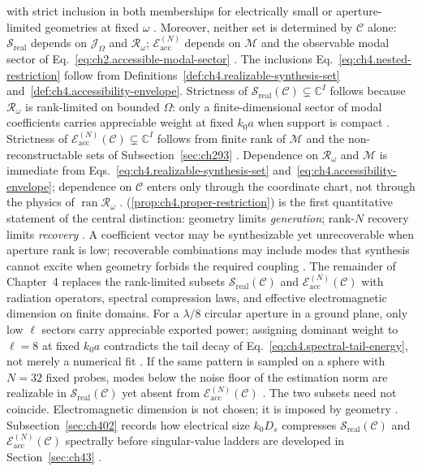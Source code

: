 with strict inclusion in both memberships for electrically small or aperture-limited geometries at
fixed \(\omega\) \cite{stratton1941}. Moreover, neither set is determined by
\(\mathcal{C}\) alone: \(\mathcal{S}_{\mathrm{real}}\) depends on \(\mathcal{J}_\Omega\) and
\(\mathcal{R}_\omega\); \(\mathcal{E}_{\mathrm{acc}}^{(N)}\) depends on \(\mathcal{M}\) and the
observable modal sector of Eq.~\eqref{eq:ch2.accessible-modal-sector}
\cite{harrington2001}.
The inclusions Eq.~\eqref{eq:ch4.nested-restriction} follow from
Definitions~\ref{def:ch4.realizable-synthesis-set} and~\ref{def:ch4.accessibility-envelope}.
Strictness of \(\mathcal{S}_{\mathrm{real}}(\mathcal{C})\subsetneq\mathbb{C}^{I}\) follows because
\(\mathcal{R}_\omega\) is rank-limited on bounded \(\Omega\): only a finite-dimensional
sector of modal coefficients carries appreciable weight at fixed \(k_0 a\) when support is compact
\cite{stratton1941}. Strictness of
\(\mathcal{E}_{\mathrm{acc}}^{(N)}(\mathcal{C})\subsetneq\mathbb{C}^{I}\) follows from finite rank
of \(\mathcal{M}\) and the non-reconstructable sets of Subsection~\ref{sec:ch293}
\cite{harrington2001}. Dependence on \(\mathcal{R}_\omega\) and \(\mathcal{M}\) is immediate from
Eqs.~\eqref{eq:ch4.realizable-synthesis-set} and~\eqref{eq:ch4.accessibility-envelope}; dependence
on \(\mathcal{C}\) enters only through the coordinate chart, not through the physics of
\(\operatorname{ran}\mathcal{R}_\omega\) \cite{devaney2004}.
(\ref{prop:ch4.proper-restriction}) is the first quantitative statement of the
central distinction: geometry limits \emph{generation}; rank-$N$ recovery limits
\emph{recovery} \cite{hansen1988}. A coefficient vector may be synthesizable yet
unrecoverable when aperture rank is low; recoverable combinations may include modes that synthesis
cannot excite when geometry forbids the required coupling \cite{harrington2001}. The
remainder of Chapter~4 replaces the rank-limited subsets
\(\mathcal{S}_{\mathrm{real}}(\mathcal{C})\) and \(\mathcal{E}_{\mathrm{acc}}^{(N)}(\mathcal{C})\)
with radiation operators, spectral compression laws, and effective electromagnetic dimension on finite
domains.
For a $\lambda/8$ circular aperture in a ground plane, only low $\ell$ sectors carry appreciable exported power;
assigning dominant weight to $\ell=8$ at fixed $k_{0}a$ contradicts the tail decay of
Eq.~\eqref{eq:ch4.spectral-tail-energy}, not merely a numerical fit \cite{stratton1941}.
If the same pattern is sampled on a sphere with $N=32$ fixed probes, modes below the noise floor of the
estimation norm are realizable in $\mathcal{S}_{\mathrm{real}}(\mathcal{C})$ yet absent from
$\mathcal{E}_{\mathrm{acc}}^{(N)}(\mathcal{C})$ \cite{harrington2001}.
The two subsets need not coincide.
Electromagnetic dimension is not chosen; it is imposed by geometry \cite{chu1948}.
Subsection~\ref{sec:ch402} records how electrical size $k_0 D_s$ compresses $\mathcal{S}_{\mathrm{real}}(\mathcal{C})$ and $\mathcal{E}_{\mathrm{acc}}^{(N)}(\mathcal{C})$ spectrally before singular-value ladders are developed in Section~\ref{sec:ch43} \cite{chu1948}.
